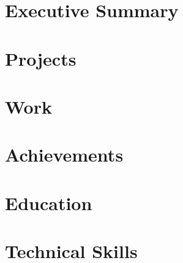 \documentclass[12pt, a4paper, sans, obeyspaces, unicode]{moderncv}
\begin{document}
\maketitle

\vspace{0.5cm}

\section{Executive Summary}


\section{Projects}


\section{Work}


\section{Achievements}


\section{Education}


\section{Technical Skills}

\end{document}

